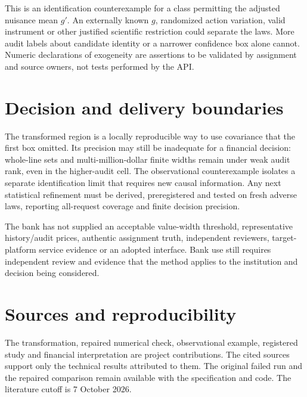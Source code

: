 This is an identification counterexample for a class permitting the adjusted
nuisance mean $g'$. An externally known $g$, randomized action variation,
valid instrument or other justified scientific restriction could separate
the laws. More audit labels about candidate identity or a narrower confidence
box alone cannot. Numeric declarations of exogeneity are assertions to be
validated by assignment and source owners, not tests performed by the API.

\section{Decision and delivery boundaries}

The transformed region is a locally reproducible way to use covariance that
the first box omitted. Its precision may still be inadequate for a financial decision: whole-line
sets and multi-million-dollar finite widths remain under weak audit rank,
even in the higher-audit cell. The observational counterexample isolates a separate identification limit that requires new causal information. Any next
statistical refinement must be derived, preregistered and tested on fresh
adverse laws, reporting all-request coverage and finite decision precision.

The bank has not supplied an acceptable value-width threshold, representative
history/audit prices, authentic assignment truth, independent reviewers,
target-platform service evidence or an adopted interface. Bank use still requires independent review and evidence that the
method applies to the institution and decision being considered.

\section*{Sources and reproducibility}

The transformation, repaired numerical check, observational example,
registered study and financial interpretation are project contributions.
The cited sources support only the technical results attributed to them.
The original failed run and the repaired comparison remain available with
the specification and code. The literature cutoff is 7 October 2026.
